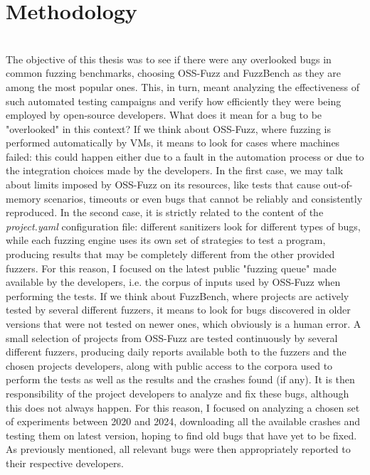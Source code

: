 
\chapter{Methodology} \label{chap_3}
\ \\
The objective of this thesis was to see if there were any overlooked bugs in common fuzzing benchmarks, choosing OSS-Fuzz and FuzzBench as they are among the most popular ones. This, in turn, meant analyzing the effectiveness of such automated testing campaigns and verify how efficiently they were being employed by open-source developers.
\newline \newline
What does it mean for a bug to be "overlooked" in this context? 
\newline \newline
If we think about OSS-Fuzz, where fuzzing is performed automatically by VMs, it means to look for cases where machines failed: this could happen either due to a fault in the automation process or due to the integration choices made by the developers.
\newline
In the first case, we may talk about limits imposed by OSS-Fuzz on its resources, like tests that cause out-of-memory scenarios, timeouts or even bugs that cannot be reliably and consistently reproduced. 
In the second case, it is strictly related to the content of the \textit{project.yaml} configuration file: different sanitizers look for different types of bugs, while each fuzzing engine uses its own set of strategies to test a program, producing results that may be completely different from the other provided fuzzers.
\newline
For this reason, I focused on the latest public "fuzzing queue" made available by the developers, i.e. the corpus of inputs used by OSS-Fuzz when performing the tests.
\newline \newline
If we think about FuzzBench, where projects are actively tested by several different fuzzers, it means to look for bugs discovered in older versions that were not tested on newer ones, which obviously is a human error.
\newline
A small selection of projects from OSS-Fuzz are tested continuously by several different fuzzers, producing daily reports available both to the fuzzers and the chosen projects developers, along with public access to the corpora used to perform the tests as well as the results and the crashes found (if any). It is then responsibility of the project developers to analyze and fix these bugs, although this does not always happen.
\newline
For this reason, I focused on analyzing a chosen set of experiments between 2020 and 2024, downloading all the available crashes and testing them on latest version, hoping to find old bugs that have yet to be fixed.
\newline \newline
As previously mentioned, all relevant bugs were then appropriately reported to their respective developers.






